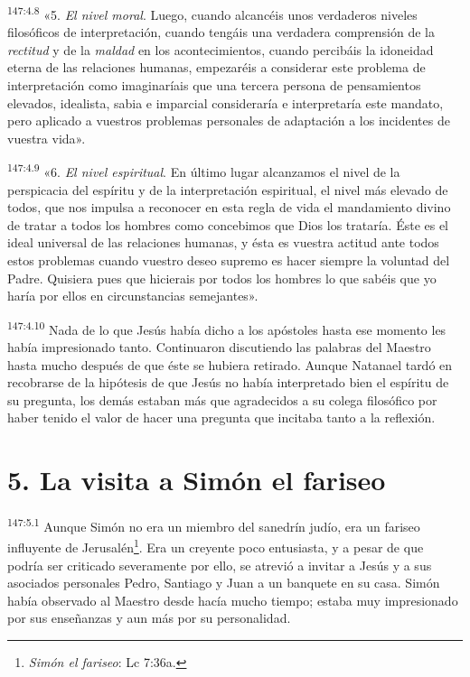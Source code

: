 \par 
\textsuperscript{147:4.8} «5. \textit{El nivel moral}. Luego, cuando alcancéis unos verdaderos niveles filosóficos de interpretación, cuando tengáis una verdadera comprensión de la \textit{rectitud} y de la \textit{maldad} en los acontecimientos, cuando percibáis la idoneidad eterna de las relaciones humanas, empezaréis a considerar este problema de interpretación como imaginaríais que una tercera persona de pensamientos elevados, idealista, sabia e imparcial consideraría e interpretaría este mandato, pero aplicado a vuestros problemas personales de adaptación a los incidentes de vuestra vida».

\par 
\textsuperscript{147:4.9} «6. \textit{El nivel espiritual}. En último lugar alcanzamos el nivel de la perspicacia del espíritu y de la interpretación espiritual, el nivel más elevado de todos, que nos impulsa a reconocer en esta regla de vida el mandamiento divino de tratar a todos los hombres como concebimos que Dios los trataría. Éste es el ideal universal de las relaciones humanas, y ésta es vuestra actitud ante todos estos problemas cuando vuestro deseo supremo es hacer siempre la voluntad del Padre. Quisiera pues que hicierais por todos los hombres lo que sabéis que yo haría por ellos en circunstancias semejantes».

\par 
\textsuperscript{147:4.10} Nada de lo que Jesús había dicho a los apóstoles hasta ese momento les había impresionado tanto. Continuaron discutiendo las palabras del Maestro hasta mucho después de que éste se hubiera retirado. Aunque Natanael tardó en recobrarse de la hipótesis de que Jesús no había interpretado bien el espíritu de su pregunta, los demás estaban más que agradecidos a su colega filosófico por haber tenido el valor de hacer una pregunta que incitaba tanto a la reflexión.

\section*{5. La visita a Simón el fariseo}
\par 
\textsuperscript{147:5.1} Aunque Simón no era un miembro del sanedrín judío, era un fariseo influyente de Jerusalén\footnote{\textit{Simón el fariseo}: Lc 7:36a.}. Era un creyente poco entusiasta, y a pesar de que podría ser criticado severamente por ello, se atrevió a invitar a Jesús y a sus asociados personales Pedro, Santiago y Juan a un banquete en su casa. Simón había observado al Maestro desde hacía mucho tiempo; estaba muy impresionado por sus enseñanzas y aun más por su personalidad.

